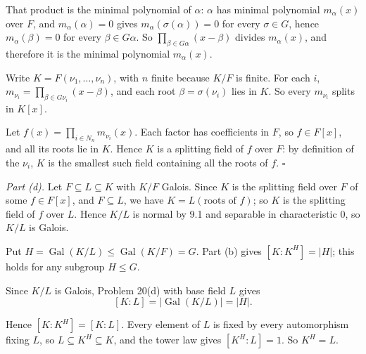 \documentclass[11pt]{article}
\begin{document}
That product is the minimal polynomial of $\alpha$: $\alpha$ has minimal polynomial $m_\alpha(x)$ over $F$, and $m_\alpha(\alpha)=0$ gives $m_\alpha(\sigma(\alpha))=0$ for every $\sigma\in G$, hence $m_\alpha(\beta)=0$ for every $\beta\in G\alpha$. So $\prod_{\beta\in G\alpha}(x-\beta)$ divides $m_\alpha(x)$, and therefore it is the minimal polynomial $m_\alpha(x)$.

Write $K=F(\nu_1,\dots,\nu_n)$, with $n$ finite because $K/F$ is finite. For each $i$, $m_{\nu_i}=\prod_{\beta\in G\nu_i}(x-\beta)$, and each root $\beta=\sigma(\nu_i)$ lies in $K$. So every $m_{\nu_i}$ splits in $K[x]$.

Let $f(x)=\prod_{i\in N_n}m_{\nu_i}(x)$. Each factor has coefficients in $F$, so $f\in F[x]$, and all its roots lie in $K$. Hence $K$ is a splitting field of $f$ over $F$: by definition of the $\nu_i$, $K$ is the smallest such field containing all the roots of $f$. $\square$

\emph{Part (d).} Let $F\subseteq L\subseteq K$ with $K/F$ Galois. Since $K$ is the splitting field over $F$ of some $f\in F[x]$, and $F\subseteq L$, we have $K=L(\text{roots of }f)$; so $K$ is the splitting field of $f$ over $L$. Hence $K/L$ is normal by 9.1 and separable in characteristic $0$, so $K/L$ is Galois.

Put $H=\operatorname{Gal}(K/L)\le\operatorname{Gal}(K/F)=G$. Part (b) gives $[K:K^H]=|H|$; this holds for any subgroup $H\le G$.

Since $K/L$ is Galois, Problem 20(d) with base field $L$ gives
\[
[K:L]=|\operatorname{Gal}(K/L)|=|H| .
\]

Hence $[K:K^H]=[K:L]$. Every element of $L$ is fixed by every automorphism fixing $L$, so $L\subseteq K^H\subseteq K$, and the tower law gives $[K^H:L]=1$. So $K^H=L$.
\end{document}
